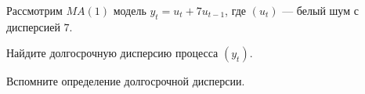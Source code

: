 
\begin{question}
Рассмотрим \(MA(1)\) модель \(y_t = u_t + 7 u_{t-1}\),
где \((u_t)\) --- белый шум с дисперсией \(7\).

Найдите долгосрочную дисперсию процесса \((y_t)\).
\end{question}

\begin{solution}
Вспомните определение долгосрочной дисперсии.
\end{solution}

